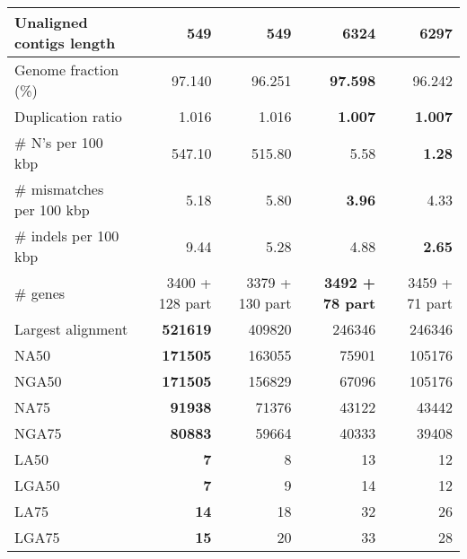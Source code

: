 \documentclass[12pt,a4paper]{article}
\begin{document}
\begin{table}[ht]
\begin{center}
\begin{tabular}{|l*{4}{|r}|}
Unaligned contigs length & {\bf 549} & {\bf 549} & 6324 & 6297 \\ \hline
Genome fraction (\%) & 97.140 & 96.251 & {\bf 97.598} & 96.242 \\ \hline
Duplication ratio & 1.016 & 1.016 & {\bf 1.007} & {\bf 1.007} \\ \hline
\# N's per 100 kbp & 547.10 & 515.80 & 5.58 & {\bf 1.28} \\ \hline
\# mismatches per 100 kbp & 5.18 & 5.80 & {\bf 3.96} & 4.33 \\ \hline
\# indels per 100 kbp & 9.44 & 5.28 & 4.88 & {\bf 2.65} \\ \hline
\# genes & 3400 + 128 part & 3379 + 130 part & {\bf 3492 + 78 part} & 3459 + 71 part \\ \hline
Largest alignment & {\bf 521619} & 409820 & 246346 & 246346 \\ \hline
NA50 & {\bf 171505} & 163055 & 75901 & 105176 \\ \hline
NGA50 & {\bf 171505} & 156829 & 67096 & 105176 \\ \hline
NA75 & {\bf 91938} & 71376 & 43122 & 43442 \\ \hline
NGA75 & {\bf 80883} & 59664 & 40333 & 39408 \\ \hline
LA50 & {\bf 7} & 8 & 13 & 12 \\ \hline
LGA50 & {\bf 7} & 9 & 14 & 12 \\ \hline
LA75 & {\bf 14} & 18 & 32 & 26 \\ \hline
LGA75 & {\bf 15} & 20 & 33 & 28 \\ \hline
\end{tabular}
\end{center}
\end{table}
\end{document}

